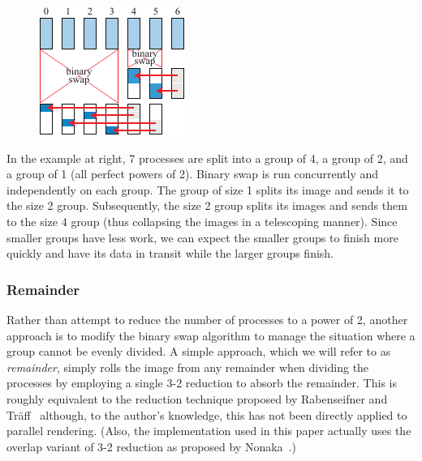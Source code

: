 \documentclass{vgtc}                          %
\newcommand*{\scite}[1]{~\cite{#1}}
\newcommand*{\keyterm}[1]{\emph{#1}}
\newcommand{\textalgorithm}[1]{\textsf{#1}\xspace}
\newcommand{\telescoping}{\textalgorithm{telescoping}}
\newcommand{\remainder}{\textalgorithm{remainder}}
\begin{document}
\begin{figure}
  \includegraphics[scale=.75]{telescoping-7-proc}
\end{figure}
In the example at right, 7 processes are split into a group of 4, a group of 2, and a group of 1 (all perfect powers of 2).
Binary swap is run concurrently and independently on each group.
The group of size 1 splits its image and sends it to the size 2 group.
Subsequently, the size 2 group splits its images and sends them to the size 4 group (thus collapsing the images in a telescoping manner).
Since smaller groups have less work, we can expect the smaller groups to finish more quickly and have its data in transit while the larger groups finish.


\subsubsection{Remainder}

Rather than attempt to reduce the number of processes to a power of 2, another approach is to modify the binary swap algorithm to manage the situation where a group cannot be evenly divided.
A simple approach, which we will refer to as \keyterm{\remainder}, simply rolls the image from any remainder when dividing the processes by employing a single 3-2 reduction to absorb the remainder.
This is roughly equivalent to the reduction technique proposed by Rabenseifner and Tr\"{a}ff\scite{Rabenseifner2004} although, to the author's knowledge, this has not been directly applied to parallel rendering.
(Also, the implementation used in this paper actually uses the overlap variant of 3-2 reduction as proposed by Nonaka\scite{Nonaka2015}.)
\end{document}
